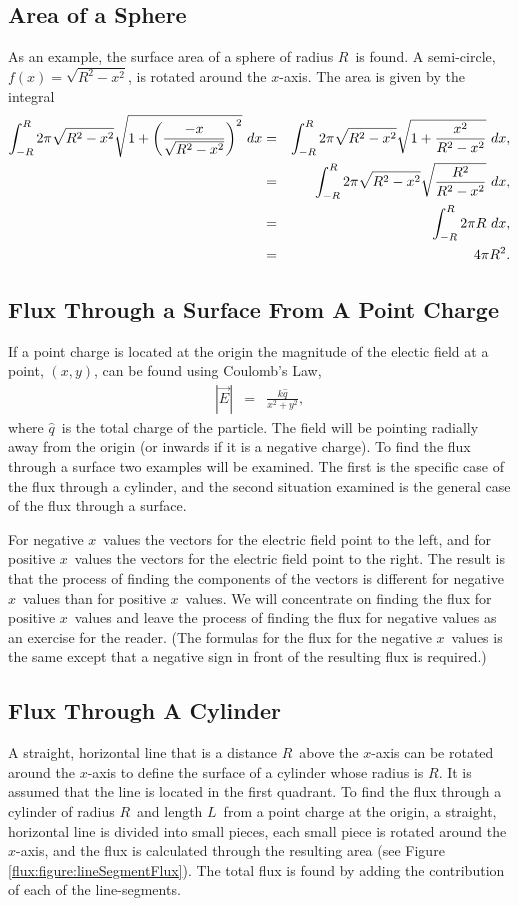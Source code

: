 \subsection{Area of a Sphere}
As an example, the surface area of a sphere of radius $R$\ is
found. A semi-circle, $f(x)=\sqrt{R^2-x^2}$, is rotated around the
$x$-axis. The area is given by the integral
\begin{eqnarray*}
  \int^R_{-R} 2 \pi \sqrt{R^2-x^2} \sqrt{1 + \left(
    \frac{-x}{\sqrt{R^2-x^2}} \right)^2 } ~ dx
    & = & \int^R_{-R} 2 \pi \sqrt{R^2-x^2} \sqrt{1 +
      \frac{x^2}{R^2-x^2}} ~ dx, \\
    & = & \int^R_{-R} 2 \pi \sqrt{R^2-x^2} \sqrt{
      \frac{R^2}{R^2-x^2}} ~ dx, \\
    & = & \int^R_{-R} 2 \pi R ~ dx, \\
    & = & 4 \pi R^2.
\end{eqnarray*}


\subsection{Flux Through a Surface From A Point Charge}
If a point charge is located at the origin the magnitude of the
electic field at a point, $(x,y)$, can be found using Coulomb's Law,
\begin{eqnarray*}
  |\vec{E}| & = & \frac{k\hat{q}}{x^2+y^2},
\end{eqnarray*}
where $\hat{q}$\  is the total charge  of the particle. The field will
be  pointing radially away   from the origin   (or inwards if it  is a
negative charge).  To  find the  flux through  a surface  two examples
will be examined. The first is the specific case of the flux through a
cylinder, and the second situation examined is the general case of the
flux through a surface.

For negative $x$\ values the vectors for the electric field point to
the left, and for positive $x$\ values the vectors for the electric
field point to the right. The result is that the process of finding
the components of the vectors is different for negative $x$\ values
than for positive $x$\ values. We will concentrate on finding the flux
for positive $x$\ values and leave the process of finding the flux for
negative values as an exercise for the reader. (The formulas for the
flux for the negative $x$\ values is the same except that a negative
sign in front of the resulting flux is required.)

\subsection{Flux Through A Cylinder}
A straight, horizontal line that is a distance $R$\ above the $x$-axis
can be rotated around the $x$-axis to define the surface of a cylinder
whose radius is $R$. It is assumed that the line is located in the
first quadrant. To find the flux through a cylinder of radius $R$\ and
length $L$\ from a point charge at the origin, a straight, horizontal
line is divided into small pieces, each small piece is rotated around
the $x$-axis, and the flux is calculated through the resulting area
(see Figure \ref{flux:figure:lineSegmentFlux}). The total flux is
found by adding the contribution of each of the line-segments.

